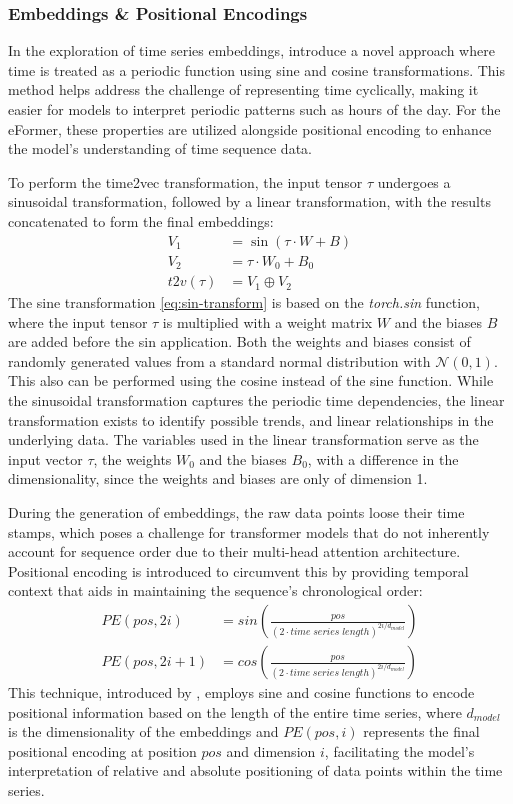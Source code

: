 \documentclass{article}
\begin{document}
\subsubsection{Embeddings \& Positional Encodings}

In the exploration of time series embeddings, \cite{time2vec} introduce a novel approach where time is treated as a periodic function using sine and cosine transformations. This method helps address the challenge of representing time cyclically, making it easier for models to interpret periodic patterns such as hours of the day. For the eFormer, these properties are utilized alongside positional encoding to enhance the model’s understanding of time sequence data.

To perform the time2vec transformation, the input tensor $\tau$ undergoes a sinusoidal transformation, followed by a linear transformation, with the results concatenated to form the final embeddings:
\begin{align}\label{eq:sin-transform}
    V_1 &= \sin(\tau \cdot W + B) \\
    V_2 &= \tau \cdot W_0 + B_0 \\
    t2v(\tau) &= V_1 \oplus V_2
\end{align}
The sine transformation \ref{eq:sin-transform} is based on the \textit{torch.sin} function, where the input tensor $\tau$ is multiplied with a weight matrix $W$ and the biases $B$ are added before the sin application. Both the weights and biases consist of randomly generated values from a standard normal distribution with $\mathcal{N}(0,1)$. This also can be performed using the cosine instead of the sine function. While the sinusoidal transformation captures the periodic time dependencies, the linear transformation exists to identify possible trends, and linear relationships in the underlying data. The variables used in the linear transformation serve as the input vector $\tau$, the weights $W_0$ and the biases $B_0$, with a difference in the dimensionality, since the weights and biases are only of dimension 1.

During the generation of embeddings, the raw data points loose their time stamps, which poses a challenge for transformer models that do not inherently account for sequence order due to their multi-head attention architecture. Positional encoding is introduced to circumvent this by providing temporal context that aids in maintaining the sequence's chronological order:
\begin{align}\label{eq:pos-encoding}
    PE(pos, 2i) &= sin \left( \frac{pos}{(2 \cdot time \; series \; length)^{2i / d_{model}}} \right) \\
    PE(pos, 2i + 1) &= cos \left( \frac{pos}{(2 \cdot time \; series \; length)^{2i / d_{model}}} \right)
\end{align}
This technique, introduced by \cite{vanilla-transformer}, employs sine and cosine functions to encode positional information based on the length of the entire time series, where $d_{model}$ is the dimensionality of the embeddings and $PE(pos, i)$ represents the final positional encoding at position $pos$ and dimension $i$, facilitating the model's interpretation of relative and absolute positioning of data points within the time series.
\end{document}
